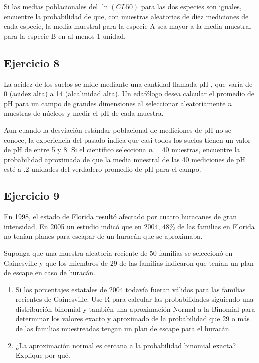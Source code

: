 \documentclass[
]{article}
\begin{document}
Si las medias poblacionales del \(\ln(CL50)\) para las dos especies son iguales, encuentre la probabilidad de que, con muestras aleatorias de diez mediciones de cada especie, la media muestral para la especie A sea mayor a la media muestral para la especie B en al menos 1 unidad.

\subsection{Ejercicio 8}\label{ejercicio-8-1}

La acidez de los suelos se mide mediante una cantidad llamada pH , que varía de 0 (acidez alta) a 14 (alcalinidad alta). Un edafólogo desea calcular el promedio de pH para un campo de grandes dimensiones al seleccionar aleatoriamente \(n\) muestras de núcleos y medir el pH de cada muestra.

Aun cuando la desviación estándar poblacional de mediciones de pH no se conoce, la experiencia del pasado indica que casi todos los suelos tienen un valor de pH de entre 5 y 8. Si el científico selecciona \(n=40\) muestras, encuentre la probabilidad aproximada de que la media muestral de las 40 mediciones de pH esté a .2 unidades del verdadero promedio de pH para el campo.

\subsection{Ejercicio 9}\label{ejercicio-9}

En 1998, el estado de Florida resultó afectado por cuatro huracanes de gran intensidad. En 2005 un estudio indicó que en 2004, \(48 \%\) de las familias en Florida no tenían planes para escapar de un huracán que se aproximaba.

Suponga que una muestra aleatoria reciente de 50 familias se seleccionó en Gainesville y que los miembros de 29 de las familias indicaron que tenían un plan de escape en caso de huracán.

\begin{enumerate}
\def\labelenumi{\alph{enumi}.}
\item
  Si los porcentajes estatales de 2004 todavía fueran válidos para las familias recientes de Gainesville. Use R para calcular las probabilidades siguiendo una distribución binomial y también una aproximación Normal a la Binomial para determinar los valores exacto y aproximado de la probabilidad que 29 o más de las familias muestreadas tengan un plan de escape para el huracán.
\item
  ¿La aproximación normal es cercana a la probabilidad binomial exacta? Explique por qué.
\end{enumerate}
\end{document}
